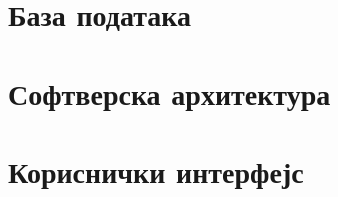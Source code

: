 \documentclass{article}
\begin{document}
\section{База података}

\section{Софтверска архитектура}

\section{Кориснички интерфејс}

\newpage

 
\end{document}
